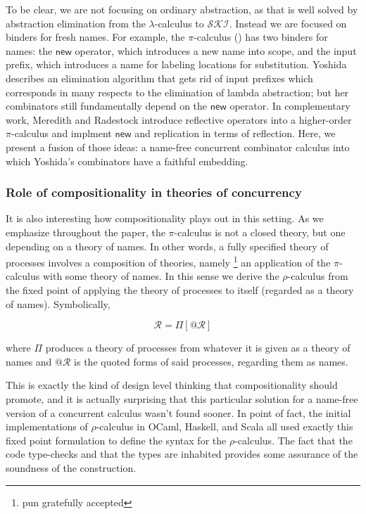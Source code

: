 \documentclass{llncs}
\makeatletter
\newcommand{\new}{\mathsf{new}}
\newcommand{\pic}{$\pi$-calculus}
\newcommand{\quotep}[1]{\mathsf{@}#1}
\newcommand{\rhoc}{$\rho$-calculus}
\makeatother
\begin{document}
To be clear, we are not focusing on ordinary abstraction, as that is
well solved by abstraction elimination from the $\lambda$-calculus to
$\mathcal{SKI}$. Instead we are focused on binders for fresh
names. For example, the {\pic} (\cite{milner91polyadicpi}) has two
binders for names: the $\new$ operator, which introduces a new name
into scope, and the input prefix, which introduces a name for labeling
locations for substitution.  Yoshida
\cite{DBLP:journals/tcs/Yoshida02} describes an elimination algorithm
that gets rid of input prefixes which corresponds in many respects to
the elimination of lambda abstraction; but her combinators still
fundamentally depend on the $\new$ operator.  In complementary work,
Meredith and Radestock \cite{DBLP:journals/entcs/MeredithR05}
introduce reflective operators into a higher-order {\pic} and implment
$\new$ and replication in terms of reflection.  Here, we present a
fusion of those ideas: a name-free concurrent combinator calculus into
which Yoshida's combinators have a faithful embedding.

\subsubsection{Role of compositionality in theories of concurrency} 
It is also interesting how compositionality plays out in this
setting. As we emphasize throughout the paper, the {\pic\;} is not a
closed theory, but one depending on a theory of names. In other words,
a fully specified theory of processes involves a composition of
theories, namely \footnote{pun gratefully accepted} an application of
the {\pic\;} with some theory of names. In this sense we derive the {\rhoc}
from the fixed point of applying the theory of processes to itself
(regarded as a theory of names). Symbolically,

\begin{equation*}
  \mathcal{R} = \Pi[\quotep{\mathcal{R}}]
\end{equation*}

where $\Pi$ produces a theory of processes from whatever it is given
as a theory of names and $\quotep{\mathcal{R}}$ is the quoted forms of
said processes, regarding them as names.

This is exactly the kind of design level thinking that
compositionality should promote, and it is actually surprising that
this particular solution for a name-free version of a concurrent
calculus wasn't found sooner. In point of fact, the initial
implementations of {\rhoc} in \textsf{OCaml}, \textsf{Haskell}, and
\textsf{Scala} all used exactly this fixed point formulation to define the
syntax for the {\rhoc}. The fact that the code type-checks
and that the types are inhabited provides some assurance of the
soundness of the construction.
\end{document}
